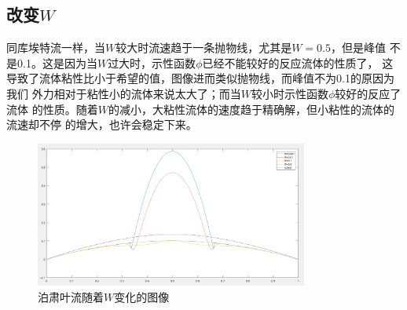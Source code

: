 \documentclass[11pt,UTF8]{ctexart}
\begin{document}
    \subsection{改变$W$}
    \par{同库埃特流一样，当$W$较大时流速趋于一条抛物线，尤其是$W=0.5$，但是峰值
    不是0.1。这是因为当$W$过大时，示性函数$\phi$已经不能较好的反应流体的性质了，
    这导致了流体粘性比小于希望的值，图像进而类似抛物线，而峰值不为0.1的原因为我们
    外力相对于粘性小的流体来说太大了；而当$W$较小时示性函数$\phi$较好的反应了流体
    的性质。随着$W$的减小，大粘性流体的速度趋于精确解，但小粘性的流体的流速却不停
    的增大，也许会稳定下来。}
    \begin{figure}[h]
        \centerline{\includegraphics[width=0.8\textwidth]{Poiseuille_W.png}}
        \caption{泊肃叶流随着$W$变化的图像}
    \end{figure}
\end{document}

